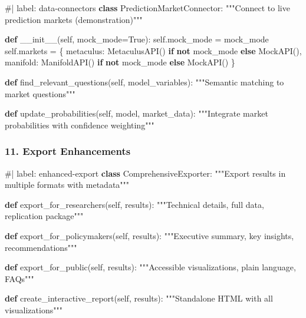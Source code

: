\documentclass[
  11pt,
  letterpaper,
]{book}
\newenvironment{Shaded}{\begin{snugshade}}{\end{snugshade}}
\newcommand{\CommentTok}[1]{\textcolor[rgb]{0.37,0.37,0.37}{#1}}
\newcommand{\ControlFlowTok}[1]{\textcolor[rgb]{0.00,0.23,0.31}{\textbf{#1}}}
\newcommand{\FunctionTok}[1]{\textcolor[rgb]{0.28,0.35,0.67}{#1}}
\newcommand{\KeywordTok}[1]{\textcolor[rgb]{0.00,0.23,0.31}{\textbf{#1}}}
\newcommand{\NormalTok}[1]{\textcolor[rgb]{0.00,0.23,0.31}{#1}}
\newcommand{\OperatorTok}[1]{\textcolor[rgb]{0.37,0.37,0.37}{#1}}
\newcommand{\StringTok}[1]{\textcolor[rgb]{0.13,0.47,0.30}{#1}}
\newcommand{\VariableTok}[1]{\textcolor[rgb]{0.07,0.07,0.07}{#1}}
\begin{document}
\begin{Shaded}
\begin{Highlighting}[]
\CommentTok{\#| label: data{-}connectors}
\KeywordTok{class}\NormalTok{ PredictionMarketConnector:}
    \CommentTok{"""Connect to live prediction markets (demonstration)"""}
    
    \KeywordTok{def} \FunctionTok{\_\_init\_\_}\NormalTok{(}\VariableTok{self}\NormalTok{, mock\_mode}\OperatorTok{=}\VariableTok{True}\NormalTok{):}
        \VariableTok{self}\NormalTok{.mock\_mode }\OperatorTok{=}\NormalTok{ mock\_mode}
        \VariableTok{self}\NormalTok{.markets }\OperatorTok{=}\NormalTok{ \{}
            \StringTok{\textquotesingle{}metaculus\textquotesingle{}}\NormalTok{: MetaculusAPI() }\ControlFlowTok{if} \KeywordTok{not}\NormalTok{ mock\_mode }\ControlFlowTok{else}\NormalTok{ MockAPI(),}
            \StringTok{\textquotesingle{}manifold\textquotesingle{}}\NormalTok{: ManifoldAPI() }\ControlFlowTok{if} \KeywordTok{not}\NormalTok{ mock\_mode }\ControlFlowTok{else}\NormalTok{ MockAPI()}
\NormalTok{        \}}
    
    \KeywordTok{def}\NormalTok{ find\_relevant\_questions(}\VariableTok{self}\NormalTok{, model\_variables):}
        \CommentTok{"""Semantic matching to market questions"""}
        
    \KeywordTok{def}\NormalTok{ update\_probabilities(}\VariableTok{self}\NormalTok{, model, market\_data):}
        \CommentTok{"""Integrate market probabilities with confidence weighting"""}
\end{Highlighting}
\end{Shaded}

\subsubsection{11. Export Enhancements}\label{export-enhancements}

\begin{Shaded}
\begin{Highlighting}[]
\CommentTok{\#| label: enhanced{-}export}
\KeywordTok{class}\NormalTok{ ComprehensiveExporter:}
    \CommentTok{"""Export results in multiple formats with metadata"""}
    
    \KeywordTok{def}\NormalTok{ export\_for\_researchers(}\VariableTok{self}\NormalTok{, results):}
        \CommentTok{"""Technical details, full data, replication package"""}
        
    \KeywordTok{def}\NormalTok{ export\_for\_policymakers(}\VariableTok{self}\NormalTok{, results):}
        \CommentTok{"""Executive summary, key insights, recommendations"""}
        
    \KeywordTok{def}\NormalTok{ export\_for\_public(}\VariableTok{self}\NormalTok{, results):}
        \CommentTok{"""Accessible visualizations, plain language, FAQs"""}
        
    \KeywordTok{def}\NormalTok{ create\_interactive\_report(}\VariableTok{self}\NormalTok{, results):}
        \CommentTok{"""Standalone HTML with all visualizations"""}
\end{Highlighting}
\end{Shaded}
\end{document}
